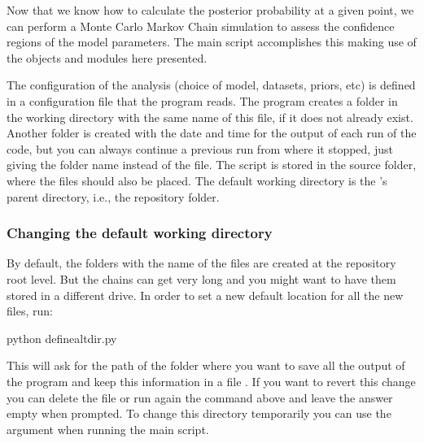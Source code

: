 \documentclass[letterpaper,12pt,english]{sphinxhowto}
\begin{document}
Now that we know how to calculate the posterior probability at a given point,
we can perform a Monte Carlo Markov Chain simulation to assess the confidence
regions of the model parameters.
The main script  accomplishes this making use of the objects and
modules here presented.

The configuration of the analysis (choice of model, datasets, priors, etc) is
defined in a  configuration file that the program reads.
The program creates a folder in the working directory with the same name of
this  file, if it does not already exist.
Another folder is created with the date and time for the output of each run of
the code, but you can always continue a previous run from where it stopped,
just giving the folder name instead of the  file.
The script is stored in the  source folder, where the  files
should also be placed.
The default working directory is the ’s parent directory, i.e., the
 repository folder.


\subsubsection{Changing the default working directory}
\label{\detokenize{beforestart:changing-the-default-working-directory}}
By default, the folders with the name of the  files are created at the
repository root level.
But the chains can get very long and you might want to have them stored in a
different drive.
In order to set a new default location for all the new files, run:

%
\begin{sphinxVerbatim}[commandchars=\\\{\}]
\PYGZdl{} python define\PYGZus{}altdir.py
\end{sphinxVerbatim}

This will ask for the path of the folder where you want to save all the output
of the program and keep this information in a file .
If you want to revert this change you can delete the  file or run
again the command above and leave the answer empty when prompted.
To change this directory temporarily you can use the argument 
when running the main script.
\end{document}
